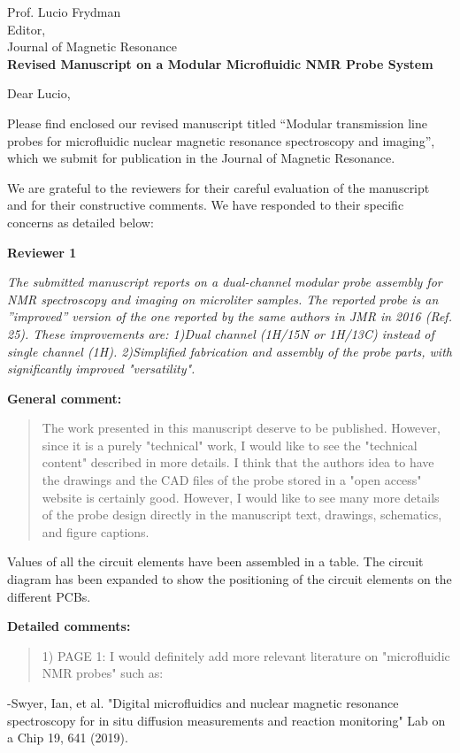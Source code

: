 \documentclass{mu-soton-letter}
\newenvironment{reviewer} {\begin{quote}\color{black!50}} {\end{quote}}
\begin{document}
\begin{letter}{Prof. Lucio Frydman\\
  Editor,\\
  Journal of Magnetic Resonance\\[2cm]
  \textbf{Revised Manuscript on a Modular Microfluidic NMR Probe System}}
\vfill
\opening{Dear Lucio,
}
Please find enclosed our revised manuscript titled
``Modular transmission line probes for microfluidic nuclear
magnetic resonance spectroscopy and imaging'', which we submit for publication
in the Journal of Magnetic Resonance.

We are grateful to the reviewers for their careful evaluation of the manuscript
and for their constructive comments. We have responded to their specific concerns
as detailed below:


\textbf{Reviewer 1}

\textcolor{black!50}
{\emph{The submitted manuscript reports on a dual-channel modular probe assembly for NMR spectroscopy and imaging on microliter samples.
  The reported probe is an ''improved'' version of the one reported by the same authors in JMR in 2016 (Ref. 25).
  These improvements are:
  1)Dual channel (1H/15N or 1H/13C) instead of single channel (1H).
  2)Simplified fabrication and assembly of the probe parts, with significantly improved "versatility".}}

\textcolor{black!50}{ \textbf{General comment:}}
 
  \begin{reviewer}
  The work presented in this manuscript deserve to be published. However, since it is a purely "technical" work, I would like to see the "technical content" described in more details.
  I think that the authors idea to have the drawings and the CAD files of the probe stored in a "open access" website is certainly good. However, I would like to see many more details of the probe design directly in the manuscript text, drawings, schematics, and figure captions.
\end{reviewer}


Values of all the circuit elements have been assembled in a table. The circuit diagram has been expanded to show the positioning of the circuit elements on the different PCBs.



\textcolor{black!50}{ \textbf{Detailed comments:}}

\begin{reviewer}
1) PAGE 1:  I would definitely add more relevant literature on "microfluidic NMR probes" such as:
\end{reviewer}
-Swyer, Ian, et al. "Digital microfluidics and nuclear magnetic resonance spectroscopy for in situ diffusion measurements and reaction monitoring" Lab on a Chip 19, 641 (2019).


\end{letter}
\end{document}
